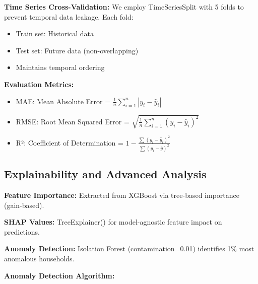 \documentclass[11pt, a4paper, oneside]{article}
\begin{document}
\textbf{Time Series Cross-Validation:}
We employ TimeSeriesSplit with 5 folds to prevent temporal data leakage. Each fold:
\begin{itemize}
    \item Train set: Historical data
    \item Test set: Future data (non-overlapping)
    \item Maintains temporal ordering
\end{itemize}

\textbf{Evaluation Metrics:}
\begin{itemize}
    \item MAE: Mean Absolute Error = $\frac{1}{n}\sum_{i=1}^{n} |y_i - \hat{y}_i|$
    \item RMSE: Root Mean Squared Error = $\sqrt{\frac{1}{n}\sum_{i=1}^{n} (y_i - \hat{y}_i)^2}$
    \item R²: Coefficient of Determination = $1 - \frac{\sum(y_i - \hat{y}_i)^2}{\sum(y_i - \bar{y})^2}$
\end{itemize}

\subsection{Explainability and Advanced Analysis}

\textbf{Feature Importance:} Extracted from XGBoost via tree-based importance (gain-based).

\textbf{SHAP Values:} TreeExplainer() for model-agnostic feature impact on predictions.

\textbf{Anomaly Detection:} Isolation Forest (contamination=0.01) identifies 1\% most anomalous households.

\textbf{Anomaly Detection Algorithm:}
\end{document}
